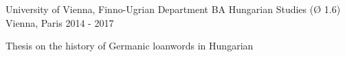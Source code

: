 \begin{cventries}
  \cventry
    {University of Vienna, Finno-Ugrian Department} %
    {BA Hungarian Studies (Ø 1.6)} %
    {Vienna, Paris} %
    {2014 - 2017} %
    {
      \begin{cvitems} %
        \item {Thesis on the history of Germanic loanwords in Hungarian}
      \end{cvitems}
    }
        
\end{cventries}
